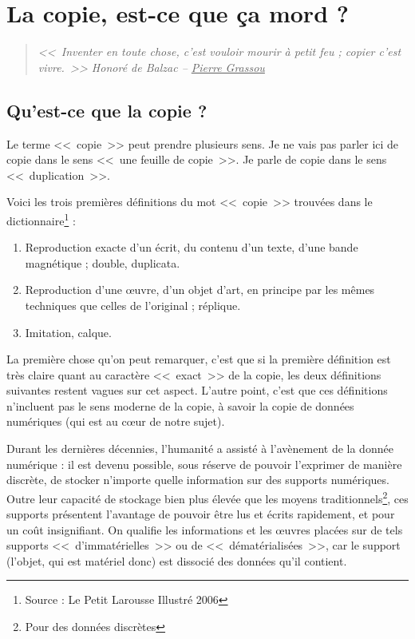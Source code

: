 \chapter{La copie, est-ce que ça mord ?}

\begin{quote}
\textit{{\Large <<~Inventer en toute chose, c'est vouloir mourir à petit feu ; copier c'est vivre.~>>} \hspace{25pt}Honoré de Balzac -- \underline{Pierre Grassou}}
\end{quote}

\section{Qu'est-ce que la copie ?}

Le terme <<~copie~>> peut prendre plusieurs sens. Je ne vais pas parler ici de copie dans le sens <<~une feuille de copie~>>. Je parle de copie dans le sens <<~duplication~>>.

Voici les trois premières définitions du mot <<~copie~>> trouvées dans le dictionnaire\footnote{Source : Le Petit Larousse Illustré 2006} :
\begin{enumerate}
\item Reproduction exacte d'un écrit, du contenu d'un texte, d'une bande magnétique ; double, duplicata.
\item Reproduction d'une œuvre, d'un objet d'art, en principe par les mêmes techniques que celles de l'original ; réplique.
\item Imitation, calque.
\end{enumerate}\bigskip

La première chose qu'on peut remarquer, c'est que si la première définition est très claire quant au caractère <<~exact~>> de la copie, les deux définitions suivantes restent vagues sur cet aspect.
L'autre point, c'est que ces définitions n'incluent pas le sens moderne de la copie, à savoir la copie de données numériques (qui est au cœur de notre sujet).

Durant les dernières décennies, l'humanité a assisté à l'avènement de la donnée numérique : il est devenu possible, sous réserve de pouvoir l'exprimer de manière discrète, de stocker n'importe quelle information sur des supports numériques.
Outre leur capacité de stockage bien plus élevée que les moyens traditionnels\footnote{Pour des données discrètes}, ces supports présentent l'avantage de pouvoir être lus et écrits rapidement, et pour un coût insignifiant.
On qualifie les informations et les œuvres placées sur de tels supports <<~d'immatérielles~>> ou de <<~dématérialisées~>>, car le support (l'objet, qui est matériel donc) est dissocié des données qu'il contient.

